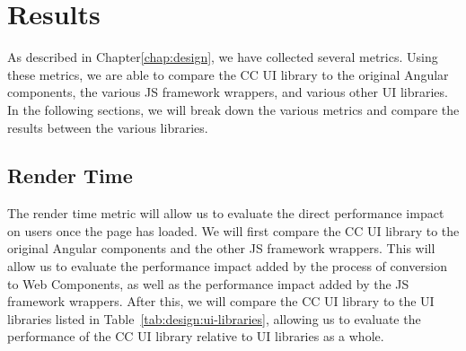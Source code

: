 \chapter{Results}\label{chap:results}
As described in Chapter\ref{chap:design}, we have collected several metrics. Using these metrics, we are able to compare the CC UI library to the original Angular components, the various JS framework wrappers, and various other UI libraries. In the following sections, we will break down the various metrics and compare the results between the various libraries.

\section{Render Time}
The render time metric will allow us to evaluate the direct performance impact on users once the page has loaded. We will first compare the CC UI library to the original Angular components and the other JS framework wrappers. This will allow us to evaluate the performance impact added by the process of conversion to Web Components, as well as the performance impact added by the JS framework wrappers. After this, we will compare the CC UI library to the UI libraries listed in Table~\ref{tab:design:ui-libraries}, allowing us to evaluate the performance of the CC UI library relative to UI libraries as a whole.

